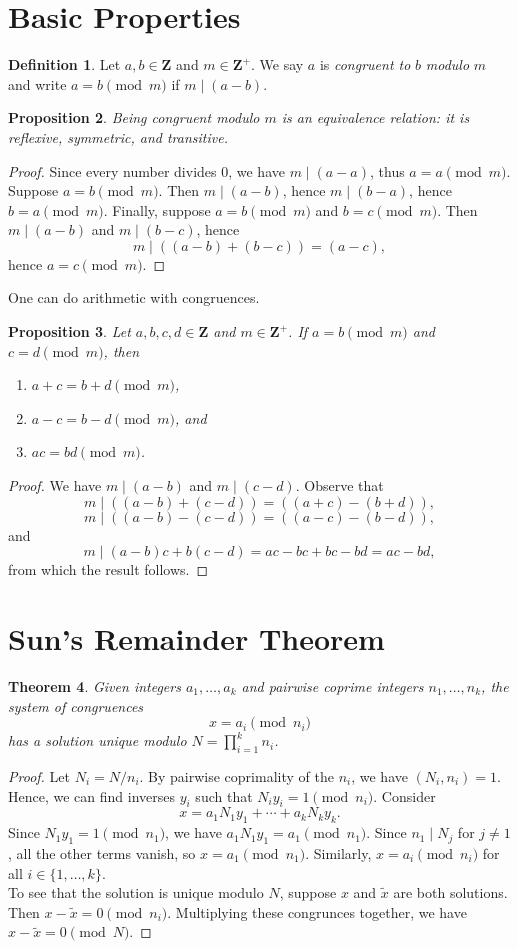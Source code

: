 \documentclass{amsbook}
\numberwithin{section}{chapter}
\theoremstyle{plain}
\newtheorem{thm}{Theorem}[section]
\newtheorem{prop}[thm]{Proposition}
\theoremstyle{definition}
\newtheorem{defn}[thm]{Definition}
\def\br{~\\[1em]}
\def\ZZ{\mathbf Z}
\begin{document}
\section{Basic Properties}
\begin{defn}
Let $a, b\in\ZZ$ and $m\in\ZZ^+$.
We say $a$ is \textit{congruent to} $b$ \textit{modulo} $m$
and write $a = b\pmod m$
if $m\mid(a - b)$.
\end{defn}
\begin{prop}
Being congruent modulo $m$ is an equivalence relation: 
it is reflexive, symmetric, and transitive.
\end{prop}
\begin{proof}
Since every number divides 0, we have $m\mid (a - a)$,
thus $a = a\pmod m$. Suppose $a = b\pmod m$. Then $m\mid(a - b)$,
hence $m\mid(b - a)$, hence $b = a\pmod m$. Finally, suppose
$a = b\pmod m$ and $b = c\pmod m$.
Then $m\mid (a - b)$ and $m\mid(b - c)$, hence
\[m\mid ((a - b) + (b - c)) = (a - c),\] hence $a = c\pmod m$.
\end{proof}
One can do arithmetic with congruences.
\begin{prop}
Let $a, b, c, d\in\ZZ$ and $m\in\ZZ^+$. If
$a = b\pmod m$ and $c = d\pmod m$, then
\begin{enumerate}
\item $a + c = b + d\pmod m$,
\item $a - c = b - d\pmod m$, and
\item $ac = bd\pmod m$.
\end{enumerate}
\end{prop}
\begin{proof}
We have $m\mid (a - b)$ and $m\mid (c - d)$.
Observe that
\[m\mid ((a - b) + (c - d)) = ((a + c) - (b + d)),\]
\[m\mid ((a - b) - (c - d)) = ((a - c) - (b - d)),\]
and
\[m\mid (a - b)c + b(c - d) = ac - bc + bc - bd = ac - bd,\]
from which the result follows.
\end{proof}
\section{Sun's Remainder Theorem}
\begin{thm}
Given integers $a_1,\dots,a_k$ and pairwise coprime integers
$n_1,\dots,n_k$, the system of congruences
\[x = a_i\pmod{n_i}\]
has a solution unique modulo $N = \prod_{i=1}^kn_i$.
\end{thm}
\begin{proof}
Let $N_i = N/n_i$. By pairwise coprimality of the $n_i$,
we have $(N_i, n_i) = 1$. Hence, we can find inverses $y_i$
such that $N_iy_i = 1\pmod{n_i}$.
Consider
\[x = a_1N_1y_1 + \cdots + a_kN_ky_k.\]
Since $N_1y_1 = 1\pmod{n_1}$, we have $a_1N_1y_1 = a_1\pmod{n_1}$.
Since $n_1\mid N_j$ for $j\ne 1$, all the other terms vanish,
so $x = a_1\pmod{n_1}$. Similarly, $x = a_i\pmod{n_i}$ for all
$i\in\{1,\dots,k\}$.
\br
To see that the solution is unique modulo $N$, suppose $x$ and
$\widetilde x$ are both solutions. Then $x - \widetilde x = 0\pmod{n_i}$.
Multiplying these congrunces together,
we have $x - \widetilde x = 0\pmod N$.
\end{proof}
\end{document}
